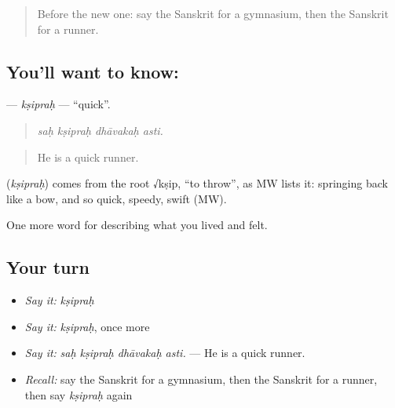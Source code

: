 \label{lesson:SA-C526-ksiprah}



\begin{quote}
Before the new one: say the Sanskrit for a gymnasium, then the Sanskrit for a runner.
\end{quote}

\subsection*{You'll want to know: }
\textbf{} — \emph{kṣipraḥ} — \textquotedblleft{}quick\textquotedblright{}.

\begin{quote}
   
\end{quote}

\begin{quote}
\emph{saḥ kṣipraḥ dhāvakaḥ asti.}
\end{quote}

\begin{quote}
He is a quick runner.
\end{quote}

\begin{cousinweb}
\textbf{} (\emph{kṣipraḥ}) comes from the root √kṣip, \textquotedblleft{}to throw\textquotedblright{}, as MW lists it: springing back like a bow, and so quick, speedy, swift (MW).
\end{cousinweb}

\begin{grammarlens}[title={What you've built}]
One more word for describing what you lived and felt.
\end{grammarlens}

\subsection*{Your turn}
\begin{itemize}
\raggedright
  \item \emph{Say it:} \emph{kṣipraḥ}
  \item \emph{Say it:} \emph{kṣipraḥ}, once more
  \item \emph{Say it:} \emph{saḥ kṣipraḥ dhāvakaḥ asti.} — He is a quick runner.
  \item \emph{Recall:} say the Sanskrit for a gymnasium, then the Sanskrit for a runner, then say \emph{kṣipraḥ} again
\end{itemize}

